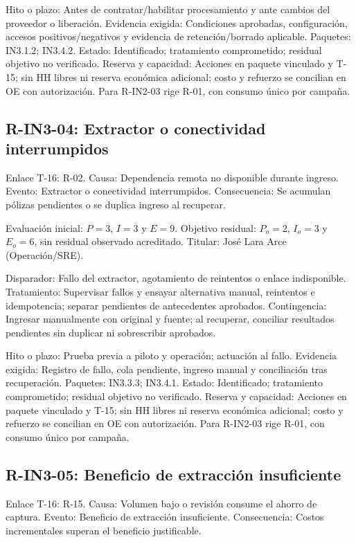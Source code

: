 Hito o plazo: Antes de contratar/habilitar procesamiento y ante cambios del proveedor o liberación. Evidencia exigida: Condiciones aprobadas, configuración, accesos positivos/negativos y evidencia de retención/borrado aplicable. Paquetes: IN3.1.2; IN3.4.2. Estado: Identificado; tratamiento comprometido; residual objetivo no verificado. Reserva y capacidad: Acciones en paquete vinculado y T-15; sin HH libres ni reserva económica adicional; costo y refuerzo se concilian en OE con autorización. Para R-IN2-03 rige R-01, con consumo único por campaña.

\subsection{R-IN3-04: Extractor o conectividad interrumpidos}
Enlace T-16: R-02. Causa: Dependencia remota no disponible durante ingreso. Evento: Extractor o conectividad interrumpidos. Consecuencia: Se acumulan pólizas pendientes o se duplica ingreso al recuperar.

Evaluación inicial: $P=3$, $I=3$ y $E=9$. Objetivo residual: $P_o=2$, $I_o=3$ y $E_o=6$, sin residual observado acreditado. Titular: José Lara Arce (Operación/SRE).

Disparador: Fallo del extractor, agotamiento de reintentos o enlace indisponible. Tratamiento: Supervisar fallos y ensayar alternativa manual, reintentos e idempotencia; separar pendientes de antecedentes aprobados. Contingencia: Ingresar manualmente con original y fuente; al recuperar, conciliar resultados pendientes sin duplicar ni sobrescribir aprobados.

Hito o plazo: Prueba previa a piloto y operación; actuación al fallo. Evidencia exigida: Registro de fallo, cola pendiente, ingreso manual y conciliación tras recuperación. Paquetes: IN3.3.3; IN3.4.1. Estado: Identificado; tratamiento comprometido; residual objetivo no verificado. Reserva y capacidad: Acciones en paquete vinculado y T-15; sin HH libres ni reserva económica adicional; costo y refuerzo se concilian en OE con autorización. Para R-IN2-03 rige R-01, con consumo único por campaña.

\subsection{R-IN3-05: Beneficio de extracción insuficiente}
Enlace T-16: R-15. Causa: Volumen bajo o revisión consume el ahorro de captura. Evento: Beneficio de extracción insuficiente. Consecuencia: Costos incrementales superan el beneficio justificable.

